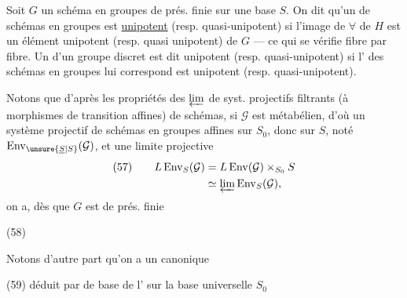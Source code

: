 Soit $G$ un schéma en groupes  de prés. finie sur une base $S$.
On dit qu'un  de schémas en groupes
est  \uline{unipotent} (resp. quasi-unipotent) si l'image de $\forall$  de $H$ est un élément unipotent (resp. quasi unipotent) de $G$ --- ce qui se vérifie fibre par fibre. Un  d'un groupe discret
est dit unipotent (resp. quasi-unipotent) si l' des schémas en groupes   lui correspond
est unipotent (resp. quasi-unipotent).


Notons que d'après les propriétés des $\varprojlim$ de syst. projectifs filtrants (à morphismes de transition affines)  de schémas, si $\mathcal{G}$ est métabélien, d'où un système projectif de schémas en groupes affines sur $S_0$, donc sur $S$, noté $\operatorname{Env}_{\unsure{\underline{S}|S}}(\mathcal{G})$, et une limite projective
\[
\begin{aligned}
(57)\qquad L\operatorname{Env}_S(\mathcal{G})
 &=L\operatorname{Env}(\mathcal{G})\times_{S_0}S\\
 &\simeq\varprojlim\operatorname{Env}_S(\mathcal{G}),
\end{aligned}
\]
on a, dès que $G$ est  de prés. finie

(58)\quad
{}

Notons d'autre part qu'on a un   canonique

(59)\quad
{}
déduit par  de base de l' sur la base universelle $S_0$

